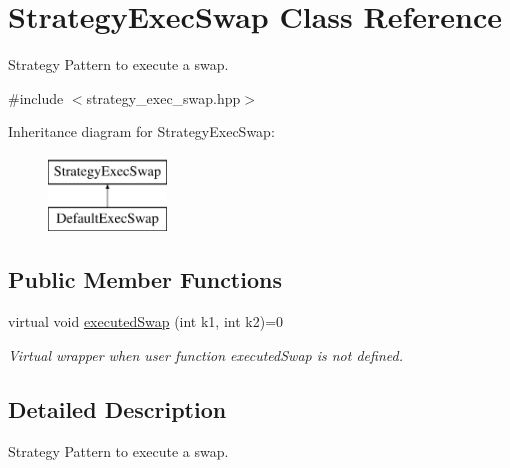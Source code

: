 \hypertarget{classStrategyExecSwap}{\section{\-Strategy\-Exec\-Swap \-Class \-Reference}
\label{classStrategyExecSwap}
}


\-Strategy \-Pattern to execute a swap.  




{\ttfamily \#include $<$strategy\-\_\-exec\-\_\-swap.\-hpp$>$}

\-Inheritance diagram for \-Strategy\-Exec\-Swap\-:\begin{figure}[H]
\begin{center}
\leavevmode
\includegraphics[height=2.000000cm]{classStrategyExecSwap}
\end{center}
\end{figure}
\subsection*{\-Public \-Member \-Functions}
\begin{DoxyCompactItemize}
\item 
virtual void \hyperlink{classStrategyExecSwap_af233f7c89ae323aa30eb1c37c7dbe83c}{executed\-Swap} (int k1, int k2)=0
\begin{DoxyCompactList}\small\item\em \-Virtual wrapper when user function executed\-Swap is not defined. \end{DoxyCompactList}\end{DoxyCompactItemize}


\subsection{\-Detailed \-Description}
\-Strategy \-Pattern to execute a swap. 


